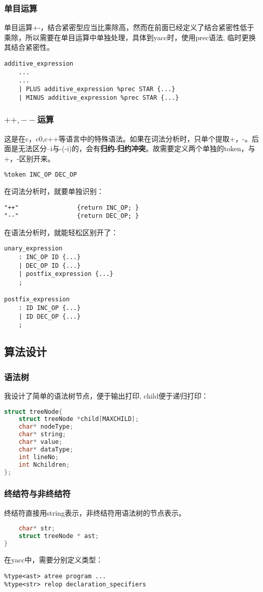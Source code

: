 \documentclass{article}
\begin{document}
\begin{CJK}{UTF8}{gkai}
\subsubsection{单目运算}

单目运算+-，结合紧密型应当比乘除高，然而在前面已经定义了结合紧密性低于乘除，所以需要在单目运算中单独处理，具体到yacc时，使用prec语法, 临时更换其结合紧密性。
\begin{verbatim}
additive_expression
    ...
    ...
    | PLUS additive_expression %prec STAR {...}
    | MINUS additive_expression %prec STAR {...}
\end{verbatim}

\subsubsection{$++,--$运算}
这是在c，c0,c++等语言中的特殊语法。如果在词法分析时，只单个提取+，-。后面是无法区分--i与-(-i)的，会有\textbf{归约-归约冲突}。故需要定义两个单独的token，与+，-区别开来。
\begin{verbatim}
%token INC_OP DEC_OP
\end{verbatim}
在词法分析时，就要单独识别：
\begin{verbatim}
"++"				{return INC_OP; }
"--"				{return DEC_OP; }
\end{verbatim}
在语法分析时，就能轻松区别开了：
\begin{verbatim}
unary_expression 
    : INC_OP ID {...}
    | DEC_OP ID {...}
    | postfix_expression {...}
    ;

postfix_expression
    : ID INC_OP {...}
    | ID DEC_OP {...}
    ;
\end{verbatim}

\subsection{算法设计}

\subsubsection{语法树}
我设计了简单的语法树节点，便于输出打印, child便于递归打印：
\begin{lstlisting}[language=c]
struct treeNode{
    struct treeNode *child[MAXCHILD];
    char* nodeType;
    char* string;
    char* value;
    char* dataType;
    int lineNo;
    int Nchildren;
};
\end{lstlisting}
\subsubsection{终结符与非终结符}
终结符直接用string表示，非终结符用语法树的节点表示。
\begin{lstlisting}[language=c]
%union {
    char* str;
    struct treeNode * ast;
}
\end{lstlisting}
在yacc中，需要分别定义类型：
\begin{verbatim}
%type<ast> atree program ...
%type<str> relop declaration_specifiers 
\end{verbatim}


\end{CJK}
\end{document}
